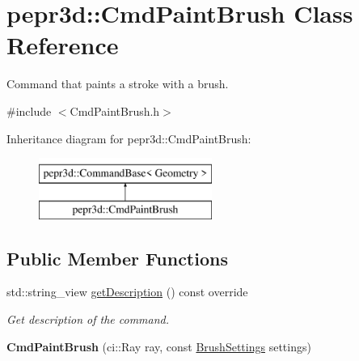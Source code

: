 \hypertarget{classpepr3d_1_1_cmd_paint_brush}{}\section{pepr3d\+::Cmd\+Paint\+Brush Class Reference}
\label{classpepr3d_1_1_cmd_paint_brush}


Command that paints a stroke with a brush.  




{\ttfamily \#include $<$Cmd\+Paint\+Brush.\+h$>$}

Inheritance diagram for pepr3d\+::Cmd\+Paint\+Brush\+:\begin{figure}[H]
\begin{center}
\leavevmode
\includegraphics[height=2.000000cm]{classpepr3d_1_1_cmd_paint_brush}
\end{center}
\end{figure}
\subsection*{Public Member Functions}
\begin{DoxyCompactItemize}
\item 
\mbox{\label{classpepr3d_1_1_cmd_paint_brush_a3e2136c68fe1c36a812e576ead824d53}} 
std\+::string\+\_\+view \mbox{\hyperlink{classpepr3d_1_1_cmd_paint_brush_a3e2136c68fe1c36a812e576ead824d53}{get\+Description}} () const override
\begin{DoxyCompactList}\small\item\em Get description of the command. \end{DoxyCompactList}\item 
\mbox{\label{classpepr3d_1_1_cmd_paint_brush_a80458a030d3d002307414e17f89da621}} 
{\bfseries Cmd\+Paint\+Brush} (ci\+::\+Ray ray, const \mbox{\hyperlink{structpepr3d_1_1_brush_settings}{Brush\+Settings}} settings)
\end{DoxyCompactItemize}
